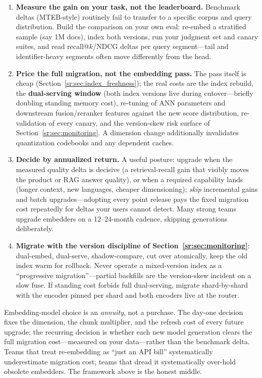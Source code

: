 \begin{enumerate}
    \item \textbf{Measure the gain on your task, not the leaderboard.} Benchmark deltas (MTEB-style) routinely fail to transfer to a specific corpus and query distribution. Build the comparison on your own eval: re-embed a stratified sample (say 1M docs), index both versions, run your judgment set and canary suites, and read recall@$k$/NDCG deltas per query segment---tail and identifier-heavy segments often move differently from the head.
    \item \textbf{Price the full migration, not the embedding pass.} The pass itself is cheap (Section~\ref{sr:sec:index_freshness}); the real costs are the index rebuild, the \textbf{dual-serving window} (both index versions live during cutover---briefly doubling standing memory cost), re-tuning of ANN parameters and downstream fusion/reranker features against the new score distribution, re-validation of every canary, and the version-skew risk surface of Section~\ref{sr:sec:monitoring}. A dimension change additionally invalidates quantization codebooks and any dependent caches.
    \item \textbf{Decide by annualized return.} A useful posture: upgrade when the measured quality delta is decisive (a retrieval-recall gain that visibly moves the product or RAG answer quality), or when a required capability lands (longer context, new languages, cheaper dimensioning); \textit{skip} incremental gains and batch upgrades---adopting every point release pays the fixed migration cost repeatedly for deltas your users cannot detect. Many strong teams upgrade embedders on a 12--24-month cadence, skipping generations deliberately.
    \item \textbf{Migrate with the version discipline of Section~\ref{sr:sec:monitoring}}: dual-embed, dual-serve, shadow-compare, cut over atomically, keep the old index warm for rollback. Never operate a mixed-version index as a ``progressive migration''---partial backfills are the version-skew incident on a slow fuse. If standing cost forbids full dual-serving, migrate shard-by-shard with the encoder pinned per shard and both encoders live at the router.
\end{enumerate}

\begin{keyinsight}
Embedding-model choice is an \textit{annuity}, not a purchase. The day-one decision fixes the dimension, the chunk multiplier, and the refresh cost of every future upgrade; the recurring decision is whether each new model generation clears the full migration cost---measured on your data---rather than the benchmark delta. Teams that treat re-embedding as ``just an API bill'' systematically underestimate migration cost; teams that dread it systematically over-hold obsolete embedders. The framework above is the honest middle.
\end{keyinsight}

